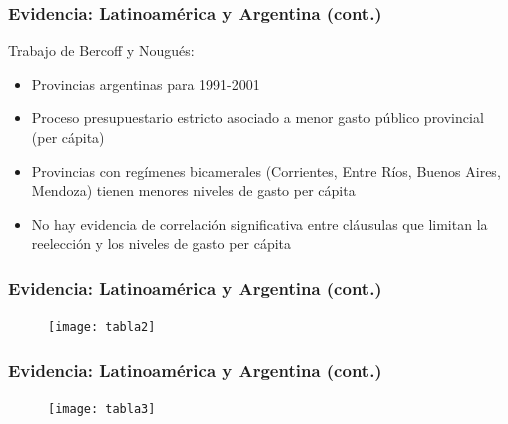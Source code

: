 \documentclass[handout,final,xcolor=dvipsnames]{beamer}
\begin{document}
\begin{frame}\frametitle{Evidencia: Latinoamérica y Argentina (cont.)}
Trabajo de Bercoff y Nougués: \medskip 
\begin{itemize}\itemsep 15pt
\item Provincias argentinas para 1991-2001
\item Proceso presupuestario estricto asociado a menor gasto público provincial (per cápita)
\item Provincias con regímenes bicamerales (Corrientes, Entre Ríos, Buenos Aires, Mendoza) tienen menores niveles de gasto per cápita
\item No hay evidencia de correlación significativa entre cláusulas que limitan la reelección y los niveles de gasto per cápita
\end{itemize}
\end{frame}


\begin{frame}\frametitle{Evidencia: Latinoamérica y Argentina (cont.)}
\begin{figure}[htbp]
    \centering
    \texttt{[image: tabla2]}
  \end{figure}
\end{frame}


\begin{frame}\frametitle{Evidencia: Latinoamérica y Argentina (cont.)}
\begin{figure}[htbp]
    \centering
    \texttt{[image: tabla3]}
  \end{figure}
\end{frame}
\end{document}
